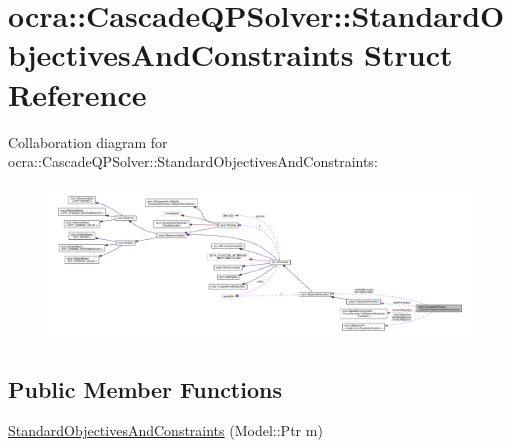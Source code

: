 \hypertarget{structocra_1_1CascadeQPSolver_1_1StandardObjectivesAndConstraints}{}\section{ocra\+:\+:Cascade\+Q\+P\+Solver\+:\+:Standard\+Objectives\+And\+Constraints Struct Reference}
\label{structocra_1_1CascadeQPSolver_1_1StandardObjectivesAndConstraints}


Collaboration diagram for ocra\+:\+:Cascade\+Q\+P\+Solver\+:\+:Standard\+Objectives\+And\+Constraints\+:\nopagebreak
\begin{figure}[H]
\begin{center}
\leavevmode
\includegraphics[width=350pt]{dc/d17/structocra_1_1CascadeQPSolver_1_1StandardObjectivesAndConstraints__coll__graph}
\end{center}
\end{figure}
\subsection*{Public Member Functions}
\begin{DoxyCompactItemize}
\item 
\hyperlink{structocra_1_1CascadeQPSolver_1_1StandardObjectivesAndConstraints_afa2f8a2043316e306b16bb8edb26b6f4}{Standard\+Objectives\+And\+Constraints} (Model\+::\+Ptr m)
\end{DoxyCompactItemize}
